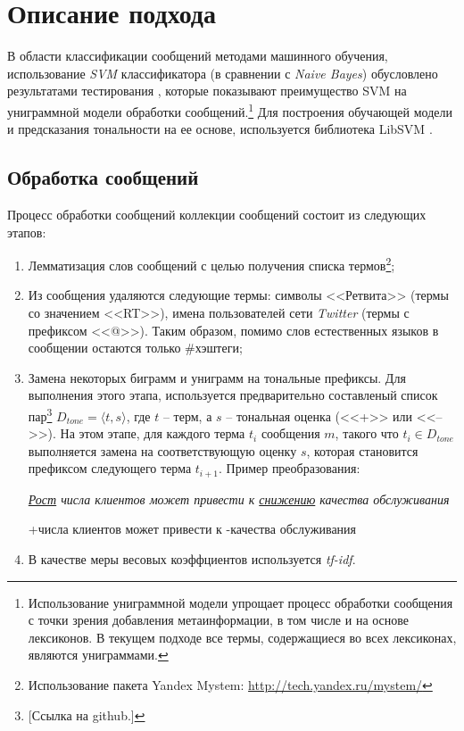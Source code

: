 \section{Описание подхода}
    \label{sec:buildingApproachDescription}
    В области классификации сообщений методами машинного обучения, использование
    {\it SVM} классификатора (в сравнении с {\it Naive Bayes}) обусловлено результатами
    тестирования \cite{svmAdvantages}, которые показывают преимущество SVM на униграммной
    модели обработки сообщений.\footnote{
        Использование униграммной модели упрощает процесс обработки сообщения с
        точки зрения добавления метаинформации, в том числе и на основе лексиконов.
        В текущем подходе все термы, содержащиеся во всех лексиконах, являются
        униграммами.
    }
    Для построения обучающей модели и предсказания
    тональности на ее основе, используется библиотека LibSVM \cite{svmClassifier}.

    \subsection{Обработка сообщений}
    \label{sec:buildingMsgProcessing}
    Процесс обработки сообщений коллекции сообщений состоит из следующих этапов:
    \begin{enumerate}
        \item Лемматизация слов сообщений с целью получения списка термов\footnote{
            Использование пакета Yandex Mystem:
            \url{http://tech.yandex.ru/mystem/}
        };

        \item Из сообщения удаляются следующие термы:
            символы <<Ретвита>> (термы со значением <<RT>>),
            имена пользователей сети {\it Twitter} (термы с префиксом <<@>>).
            Таким образом, помимо слов естественных языков в сообщении остаются
            только \#хэштеги;
        \item Замена некоторых биграмм и униграмм на тональные префиксы.
            Для выполнения этого этапа, используется предварительно составленый
            список пар\footnote{
                [Ссылка на github.]
            }
            $D_{tone} = {\langle t, s\rangle}$, где $t$ -- терм, а $s$ --
            тональная оценка (<<+>> или <<-->>). На этом этапе, для каждого терма $t_i$
            сообщения $m$, такого что $t_i \in D_{tone}$ выполняется замена на соответствующую
            оценку $s$, которая становится префиксом следующего терма $t_{i+1}$.
            Пример преобразования:
            \begin{center}
                \it
                \underline{Рост} числа клиентов может привести к \underline{снижению} качества обслуживания

               +числа клиентов может привести к -качества обслуживания
            \end{center}
        \item В качестве меры весовых коэффциентов используется {\it tf-idf}.
    \end{enumerate}

